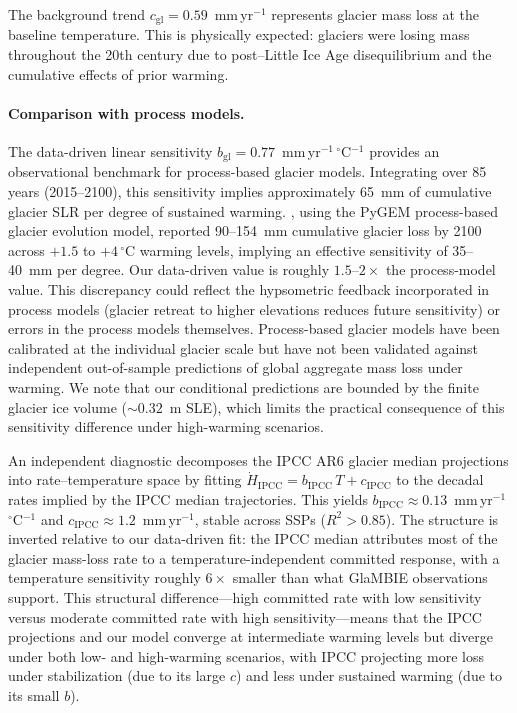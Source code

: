 \documentclass[11pt]{article}
\begin{document}
The background trend $c_{\mathrm{gl}} = 0.59$~mm\,yr$^{-1}$ represents glacier mass loss at the baseline temperature. This is physically expected: glaciers were losing mass throughout the 20th century due to post--Little Ice Age disequilibrium and the cumulative effects of prior warming.

\paragraph{Comparison with process models.}
The data-driven linear sensitivity $b_{\mathrm{gl}} = 0.77$~mm\,yr$^{-1}$\,$^\circ$C$^{-1}$ provides an observational benchmark for process-based glacier models. Integrating over 85 years (2015--2100), this sensitivity implies approximately 65~mm of cumulative glacier SLR per degree of sustained warming. \citet{Rounce2023}, using the PyGEM process-based glacier evolution model, reported 90--154~mm cumulative glacier loss by 2100 across $+1.5$ to $+4\,^\circ$C warming levels, implying an effective sensitivity of 35--40~mm per degree. Our data-driven value is roughly $1.5$--$2\times$ the process-model value. This discrepancy could reflect the hypsometric feedback incorporated in process models (glacier retreat to higher elevations reduces future sensitivity) or errors in the process models themselves. Process-based glacier models have been calibrated at the individual glacier scale but have not been validated against independent out-of-sample predictions of global aggregate mass loss under warming.  We note that our conditional predictions are bounded by the finite glacier ice volume ($\sim\!0.32$~m SLE), which limits the practical consequence of this sensitivity difference under high-warming scenarios.

An independent diagnostic decomposes the IPCC AR6 glacier median projections into rate--temperature space by fitting $\dot{H}_{\mathrm{IPCC}} = b_{\mathrm{IPCC}}\, T + c_{\mathrm{IPCC}}$ to the decadal rates implied by the IPCC median trajectories. This yields $b_{\mathrm{IPCC}} \approx 0.13$~mm\,yr$^{-1}$\,$^\circ$C$^{-1}$ and $c_{\mathrm{IPCC}} \approx 1.2$~mm\,yr$^{-1}$, stable across SSPs ($R^2 > 0.85$). The structure is inverted relative to our data-driven fit: the IPCC median attributes most of the glacier mass-loss rate to a temperature-independent committed response, with a temperature sensitivity roughly $6\times$ smaller than what GlaMBIE observations support. This structural difference---high committed rate with low sensitivity versus moderate committed rate with high sensitivity---means that the IPCC projections and our model converge at intermediate warming levels but diverge under both low- and high-warming scenarios, with IPCC projecting more loss under stabilization (due to its large $c$) and less under sustained warming (due to its small $b$).
\end{document}
